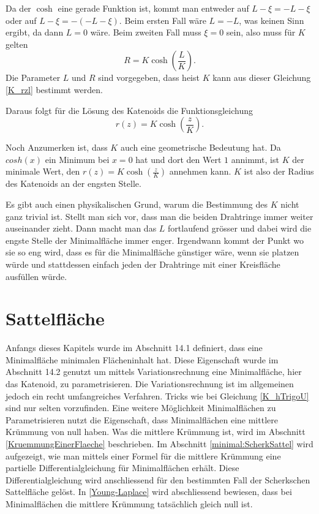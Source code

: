 \begin{refsection}
Da der $\cosh$ eine gerade Funktion ist, kommt man entweder auf $L-\xi=-L-\xi$ oder auf $L-\xi=-(-L-\xi)$. 
Beim ersten Fall wäre $L=-L$, was keinen Sinn ergibt, da dann $L=0$ wäre. Beim zweiten Fall muss $\xi=0$ sein, also muss für $K$ gelten 
\begin{equation} \label{K_rzl}
R=K \cosh\left(\frac{L}{K}\right).
\end{equation}
Die Parameter $L$ und $R$ sind vorgegeben, dass heist $K$ kann aus dieser Gleichung \eqref{K_rzl} bestimmt werden.

Daraus folgt für die Lösung des Katenoids die Funktionsgleichung 
\begin{equation} \label{K_rz}
r(z)=K \cosh\left(\frac{z}{K}\right).
\end{equation}

Noch Anzumerken ist, dass $K$ auch eine geometrische Bedeutung hat. Da $cosh(x)$ ein Minimum bei $x=0$ hat und dort den Wert $1$ annimmt, ist $K$ der minimale Wert, den $r(z)=K \cosh\left(\frac{z}{K}\right)$ annehmen kann. $K$ ist also der Radius des 
Katenoids an der engsten Stelle.

Es gibt auch einen physikalischen Grund, warum die Bestimmung des $K $ nicht ganz trivial ist. 
Stellt man sich vor, dass man die beiden Drahtringe immer weiter auseinander zieht. Dann macht man das $L$ fortlaufend grösser und dabei wird die engste Stelle der Minimalfläche immer enger. Irgendwann kommt der Punkt wo sie so eng wird, dass es für die Minimalfläche günstiger wäre, wenn sie platzen würde und stattdessen einfach jeden der Drahtringe mit einer Kreisfläche ausfüllen würde.


\section{Sattelfläche}
Anfangs dieses Kapitels wurde im Abschnitt 14.1 definiert, dass eine Minimalfläche minimalen Flächeninhalt hat. Diese Eigenschaft wurde im Abschnitt 14.2 genutzt um mittels Variationsrechnung eine Minimalfläche, hier das Katenoid, zu parametrisieren. Die Variationsrechnung ist im allgemeinen jedoch ein recht umfangreiches Verfahren. Tricks wie bei Gleichung \ref{K_hTrigoU} sind nur selten vorzufinden. Eine weitere Möglichkeit Minimalflächen zu Parametrisieren nutzt die Eigenschaft, dass Minimalflächen eine mittlere Krümmung von null haben. Was die mittlere Krümmung ist, wird im Abschnitt \ref{KruemmungEinerFlaeche} beschrieben. Im Abschnitt \ref{minimal:ScherkSattel} wird aufgezeigt, wie man mittels einer Formel für die mittlere Krümmung eine partielle Differentialgleichung für Minimalflächen erhält. Diese Differentialgleichung wird anschliessend für den bestimmten Fall der Scherkschen Sattelfläche gelöst. In \ref{Young-Laplace} wird abschliessend bewiesen, dass bei Minimalflächen die mittlere Krümmung tatsächlich gleich null ist.


\end{refsection}
